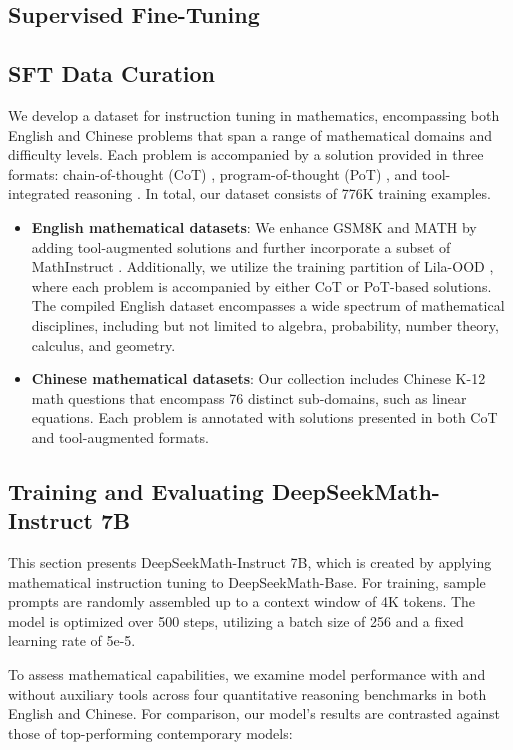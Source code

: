 \begin{itemize}[topsep=0pt]
\section{Supervised Fine-Tuning}

\subsection{SFT Data Curation}

We develop a dataset for instruction tuning in mathematics, encompassing both English and Chinese problems that span a range of mathematical domains and difficulty levels. Each problem is accompanied by a solution provided in three formats: chain-of-thought (CoT) \citep{cot}, program-of-thought (PoT) \citep{pot,pal}, and tool-integrated reasoning \citep{tora}. In total, our dataset consists of 776K training examples.

\begin{itemize}[topsep=0pt]
    \item \textbf{English mathematical datasets}: We enhance GSM8K and MATH by adding tool-augmented solutions and further incorporate a subset of MathInstruct \citep{MathInstruct}. Additionally, we utilize the training partition of Lila-OOD \citep{lila}, where each problem is accompanied by either CoT or PoT-based solutions. The compiled English dataset encompasses a wide spectrum of mathematical disciplines, including but not limited to algebra, probability, number theory, calculus, and geometry.
    \item \textbf{Chinese mathematical datasets}: Our collection includes Chinese K-12 math questions that encompass 76 distinct sub-domains, such as linear equations. Each problem is annotated with solutions presented in both CoT and tool-augmented formats.
\end{itemize}

\subsection{Training and Evaluating DeepSeekMath-Instruct 7B}

This section presents DeepSeekMath-Instruct 7B, which is created by applying mathematical instruction tuning to DeepSeekMath-Base. For training, sample prompts are randomly assembled up to a context window of 4K tokens. The model is optimized over 500 steps, utilizing a batch size of 256 and a fixed learning rate of 5e-5.

To assess mathematical capabilities, we examine model performance with and without auxiliary tools across four quantitative reasoning benchmarks in both English and Chinese. For comparison, our model's results are contrasted against those of top-performing contemporary models:


\end{itemize}

